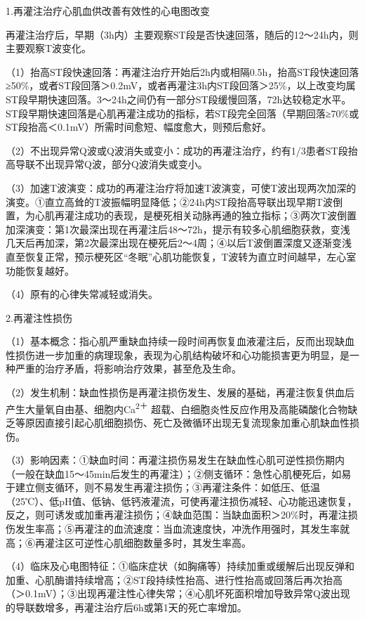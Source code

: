 1.再灌注治疗心肌血供改善有效性的心电图改变

再灌注治疗后，早期（3h内）主要观察ST段是否快速回落，随后的12～24h内，则主要观察T波变化。

（1）抬高ST段快速回落：再灌注治疗开始后2h内或相隔0.5h，抬高ST段快速回落≥50\%，或者ST段回落＞0.2mV，或者再灌注3h内ST段回落＞25\%，以上改变均属ST段早期快速回落。3～24h之间仍有一部分ST段缓慢回落，72h达较稳定水平。ST段早期快速回落是心肌再灌注成功的指标，若ST段完全回落（早期回落≥70\%或ST段抬高＜0.1mV）所需时间愈短、幅度愈大，则预后愈好。

（2）不出现异常Q波或Q波消失或变小：成功的再灌注治疗，约有1/3患者ST段抬高导联不出现异常Q波，部分Q波消失或变小。

（3）加速T波演变：成功的再灌注治疗将加速T波演变，可使T波出现两次加深的演变。①直立高耸的T波振幅明显降低；②24h内ST段抬高导联出现早期T波倒置，为心肌再灌注成功的表现，是梗死相关动脉再通的独立指标；③两次T波倒置加深演变：第1次最深出现在再灌注后48～72h，提示有较多心肌细胞获救，变浅几天后再加深，第2次最深出现在梗死后2～4周；④以后T波倒置深度又逐渐变浅直至恢复正常，预示梗死区“冬眠”心肌功能恢复，T波转为直立时间越早，左心室功能恢复越好。

（4）原有的心律失常减轻或消失。

2.再灌注性损伤

（1）基本概念：指心肌严重缺血持续一段时间再恢复血液灌注后，反而出现缺血性损伤进一步加重的病理现象，表现为心肌结构破坏和心功能损害更为明显，是一种严重的治疗矛盾，将影响治疗效果，甚至危及生命。

（2）发生机制：缺血性损伤是再灌注损伤发生、发展的基础，再灌注恢复供血后产生大量氧自由基、细胞内Ca\textsuperscript{2＋}
超载、白细胞炎性反应作用及高能磷酸化合物缺乏等原因直接引起心肌细胞损伤、死亡及微循环出现无复流现象加重心肌缺血性损伤。

（3）影响因素：①缺血时间：再灌注损伤易发生在缺血性心肌可逆性损伤期内（一般在缺血15～45min后发生的再灌注）；②侧支循环：急性心肌梗死后，如易于建立侧支循环，则不易发生再灌注损伤；③再灌注条件：如低压、低温（25℃）、低pH值、低钠、低钙液灌流，可使再灌注损伤减轻、心功能迅速恢复，反之，则可诱发或加重再灌注损伤；④缺血范围：当缺血面积＞20\%时，再灌注损伤发生率高；⑤再灌注的血流速度：当血流速度快，冲洗作用强时，其发生率就高；⑥再灌注区可逆性心肌细胞数量多时，其发生率高。

（4）临床及心电图特征：①临床症状（如胸痛等）持续加重或缓解后出现反弹和加重、心肌酶谱持续增高；②ST段持续性抬高、进行性抬高或回落后再次抬高（＞0.1mV）；③出现再灌注性心律失常；④心肌坏死面积增加导致异常Q波出现的导联数增多，再灌注治疗后6h或第1天的死亡率增加。

